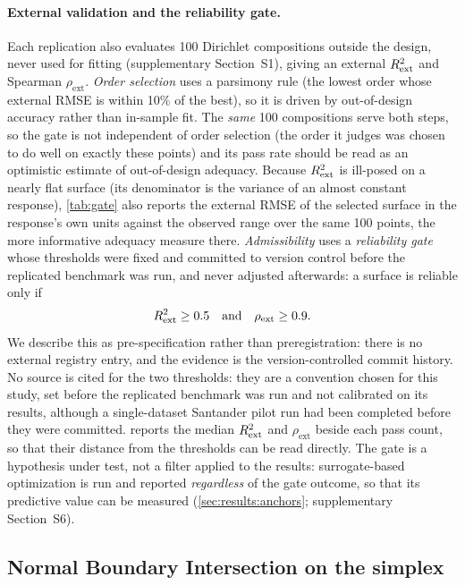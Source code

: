 \paragraph{External validation and the reliability gate.} Each replication also evaluates 100 Dirichlet compositions
outside the design, never used for fitting (supplementary Section~S1), giving an external $R^{2}_{\mathrm{ext}}$ and Spearman
$\rho_{\mathrm{ext}}$. \emph{Order selection} uses a parsimony rule (the
lowest order whose external RMSE is within 10\% of the best), so it is driven by out-of-design accuracy rather than
in-sample fit. The \emph{same} 100 compositions serve both steps, so the gate is not independent of order selection
(the order it judges was chosen to do well on exactly these points) and its pass rate should be read as an
optimistic estimate of out-of-design adequacy. Because $R^{2}_{\mathrm{ext}}$ is ill-posed on a nearly flat surface (its
denominator is the variance of an almost constant response), \cref{tab:gate} also reports the external RMSE of the
selected surface in the response's own units against the observed range over the same 100 points, the more
informative adequacy measure there. \emph{Admissibility} uses a \emph{reliability gate} whose thresholds
were fixed and committed to version control before the replicated benchmark was run, and never adjusted afterwards: a
surface is reliable only if
\begin{equation}
R^{2}_{\mathrm{ext}} \ge 0.5 \quad\text{and}\quad \rho_{\mathrm{ext}} \ge 0.9 .
\label{eq:gate}
\end{equation}
We describe this as pre-specification rather than preregistration: there is no
external registry entry, and the evidence is the version-controlled commit history. No source is cited for the two
thresholds: they are a convention chosen for this study, set before the replicated benchmark was run and not
calibrated on its results, although a single-dataset Santander pilot run had been completed before they were
committed.  reports the median $R^{2}_{\mathrm{ext}}$ and $\rho_{\mathrm{ext}}$ beside each pass
count, so that their distance from the thresholds can be read directly. The gate is a hypothesis under
test, not a filter applied to the results: surrogate-based optimization is run and reported \emph{regardless} of the
gate outcome, so that its predictive value can be measured (\cref{sec:results:anchors}; supplementary Section~S6).

\subsection{Normal Boundary Intersection on the simplex}
\label{sec:method:nbi}

